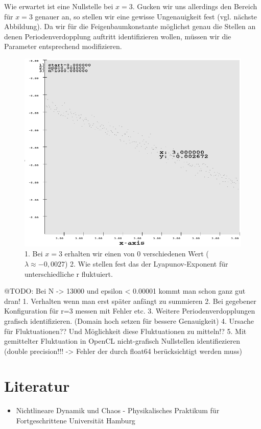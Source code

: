 \documentclass{scrartcl}
\begin{document}
Wie erwartet ist eine Nullstelle bei $x=3$. Gucken wir uns allerdings den Bereich für $x=3$ genauer an, so stellen wir eine gewisse Ungenauigkeit fest (vgl. nächste Abbildung). Da wir für die Feigenbaumkonstante möglichst genau die Stellen an denen Periodenverdopplung auftritt identifizieren wollen, müssen wir die Parameter entsprechend modifizieren.
\begin{figure}
	\centering
	\includegraphics[scale=0.50]{lyapunov_1000_at_3}
	\caption{1. Bei $x=3$ erhalten wir einen von 0 verschiedenen Wert ($\lambda\approx-0,0027$) 2. Wie stellen fest das der Lyapunov-Exponent für unterschiedliche r fluktuiert.}
	\label{img:lyapunov_1000_at_3}
\end{figure}
\newline
@TODO: Bei N -> 13000 und epsilon < 0.00001 kommt man schon ganz gut dran!
1. Verhalten wenn man erst später anfängt zu summieren
2. Bei gegebener Konfiguration für r=3 messen mit Fehler etc.
3. Weitere Periodenverdopplungen grafisch identifizieren. (Domain hoch setzen für bessere Genauigkeit)
4. Ursache für Fluktuationen?? Und Möglichkeit diese Fluktuationen zu mitteln!?
5. Mit gemittelter Fluktuation in OpenCL nicht-grafisch Nullstellen identifiezieren (double precision!!! -> Fehler der durch float64 berücksichtigt werden muss)

\section{ Literatur }
\begin{itemize} 
\item Nichtlineare Dynamik und Chaos - Physikalisches Praktikum für Fortgeschrittene Universität Hamburg
\end{itemize}
\end{document}
